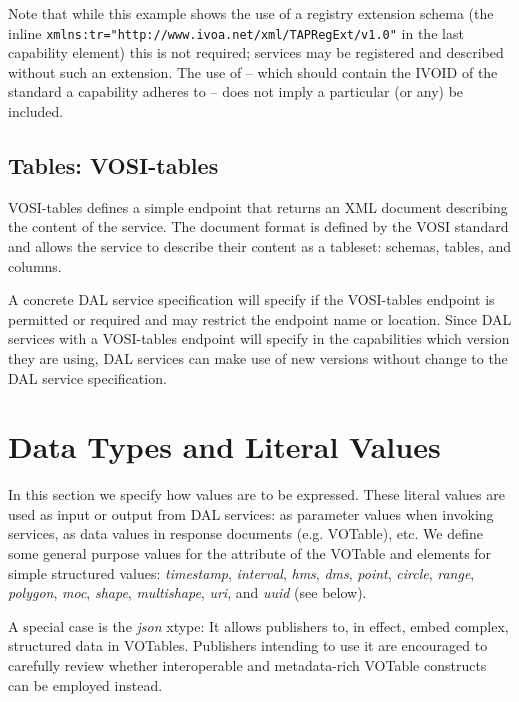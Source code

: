 \documentclass[11pt,letter]{ivoa}
\begin{document}
Note that while this example shows the use of a registry extension schema (the
inline \verb|xmlns:tr="http://www.ivoa.net/xml/TAPRegExt/v1.0"| in the last capability
element) this is not required; services may be registered and described without
such an extension. The use of  -- which should contain the
IVOID of
the standard a capability adheres to -- does not imply a particular (or any)
 be included.

\subsection{Tables: VOSI-tables}
\label{sec:vosi-tables}
VOSI-tables \citep{2017ivoa.spec.0524G} defines a simple endpoint that returns an
XML document
describing the content of the service. The document format is defined by the
VOSI \citep{2017ivoa.spec.0524G} standard and allows the service to
describe their content
as a tableset: schemas, tables, and columns.

A concrete DAL service specification will specify if the VOSI-tables endpoint is
permitted or required and may restrict the endpoint name or location.
Since DAL services with a VOSI-tables endpoint will specify
in the capabilities which version they are using, DAL services can make use of
new versions without change to the DAL service specification.

\section{Data Types and Literal Values}
\label{sec:xtypes}
In this section we specify how values are to be expressed. These literal values
are used as input or output from DAL services: as parameter values when
invoking services, as data values in response documents (e.g. VOTable),
etc. We define some general purpose values for the  attribute of
the VOTable  and  elements for simple
structured values: \emph{timestamp}, \emph{interval},
\emph{hms}, \emph{dms},
\emph{point}, \emph{circle}, \emph{range}, \emph{polygon}, \emph{moc},
\emph{shape}, \emph{multishape}, \emph{uri}, and \emph{uuid} (see below).

A special case is the \emph{json} xtype: It allows publishers to, in
effect, embed complex, structured data in VOTables.  Publishers
intending to use it are encouraged to carefully review whether
interoperable and metadata-rich VOTable constructs can be employed
instead.
\end{document}
